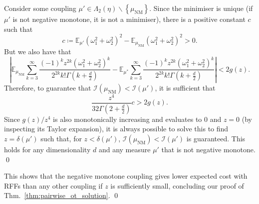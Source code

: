 Consider some coupling $\mu' \in \Lambda_2(\eta) \backslash \left \{ \mu_\textrm{NM} \right \}$. 
Since the minimiser is unique (if $\mu'$ is not negative monotone, it is not a minimiser), there is a positive constant $c$ such that
\begin{equation}
    c \coloneqq \mathbb{E}_{\mu'}\left( \omega_1^2 + \omega_2^2 \right)^2 - \mathbb{E}_{\mu_\textrm{NM}}\left( \omega_1^2 + \omega_2^2 \right)^2 > 0.
\end{equation}
But we also have that 
\begin{equation}
    \left | \mathbb{E}_{\mu_\textrm{NM}} \sum_{k=3}^\infty \frac{(-1)^k z^{2k} \left( \omega_1^2 + \omega_2^2 \right)^k}{2^{2k} k! \Gamma(k+\frac{d}{2})}  - \mathbb{E}_{\mu^*} \sum_{k=3}^\infty \frac{(-1)^k z^{2k} \left( \omega_1^2 + \omega_2^2 \right)^k}{2^{2k} k! \Gamma(k+\frac{d}{2})}  \right| < 2g(z).
\end{equation}
Therefore, to guarantee that $\mathcal{I}(\mu_\textrm{NM}) < \mathcal{I}(\mu')$, it is sufficient that
\begin{equation}
    \frac{z^4}{32 \Gamma(2 + \frac{d}{2})} c > 2g(z).
\end{equation}
Since $g(z)/z^4$ is also monotonically increasing and evaluates to $0$ and $z=0$ (by inspecting its Taylor expansion), it is always possible to solve this to find $z = \delta(\mu')$ such that, for $z < \delta(\mu')$, $\mathcal{I}(\mu_\textrm{NM}) < \mathcal{I}(\mu')$ is guaranteed.
This holds for any dimensionality $d$ and any measure $\mu'$ that is not negative monotone. \qed

This shows that the negative monotone coupling gives lower expected cost with RFFs than any other coupling if $z$ is sufficiently small, concluding our proof of Thm.~\ref{thm:pairwise_ot_solution}. \qed




